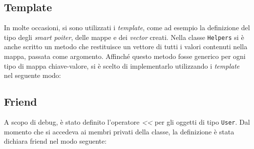 \subsection{Template}
In molte occasioni, si sono utilizzati i \textit{template}, come ad esempio la definizione del tipo degli \textit{smart poiter}, delle mappe e dei \textit{vector} creati. Nella classe \texttt{Helpers} si è anche scritto un metodo che restituisce un vettore di tutti i valori contenuti nella mappa, passata come argomento. Affinché questo metodo fosse generico per ogni tipo di mappa chiave-valore, si è scelto di implementarlo utilizzando i \textit{template} nel seguente modo:


\subsection{Friend}
A scopo di debug, è stato definito l'operatore \textit{<<} per gli oggetti di tipo \texttt{User}. Dal momento che si accedeva ai membri privati della classe, la definizione è stata dichiara friend nel modo seguente:

